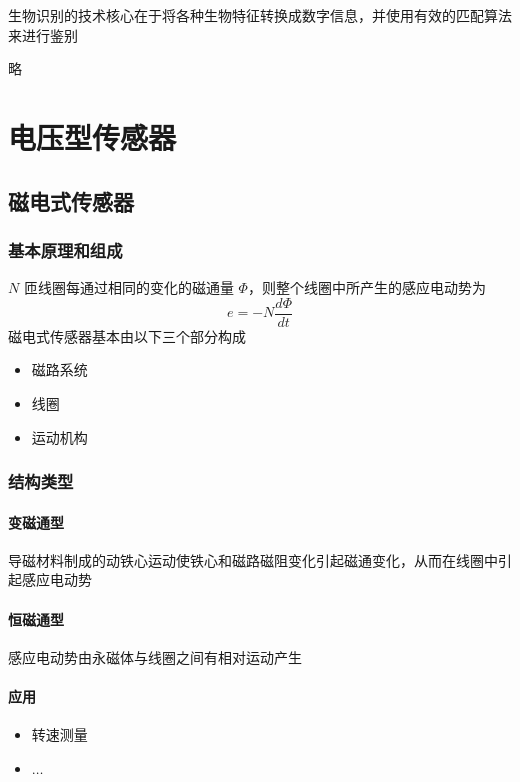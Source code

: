 \documentclass[11pt]{book}
\begin{document}
生物识别的技术核心在于将各种生物特征转换成数字信息，并使用有效的匹配算法来进行鉴别

略

\chapter{电压型传感器}

\section{磁电式传感器}

\subsection{基本原理和组成}

$N$ 匝线圈每通过相同的变化的磁通量 $\Phi$，则整个线圈中所产生的感应电动势为
$$
	e = - N \frac{d \Phi}{d t} 
$$
磁电式传感器基本由以下三个部分构成
\begin{itemize}
	\item 磁路系统
	\item 线圈
	\item 运动机构
\end{itemize}

\subsection{结构类型}

\subsubsection{变磁通型}%
\label{ssub:bian_ci_tong_xing_}

导磁材料制成的动铁心运动使铁心和磁路磁阻变化引起磁通变化，从而在线圈中引起感应电动势

\subsubsection{恒磁通型}%
\label{ssub:heng_ci_tong_xing_}

感应电动势由永磁体与线圈之间有相对运动产生

\subsubsection{应用}%
\label{ssub:ying_yong_}

\begin{itemize}
	\item 转速测量
	\item $\ldots$
\end{itemize}
\end{document}
